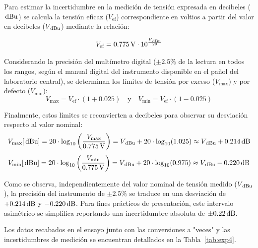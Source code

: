 Para estimar la incertidumbre en la medición de tensión expresada en decibeles
($\,\mathrm{dBu}$) se calcula la tensión eficaz ($V_{\text{ef}}$) correspondiente en
voltios a partir del valor en decibeles ($V_{\,\mathrm{dBu}}$) mediante la relación:

\begin{equation}
    V_{\text{ef}} = 0.775\,\mathrm{V} \cdot 10^{\frac{V_{\,\mathrm{dBu}}}{20}}
\end{equation}

Considerando la precisión del multímetro digital ($\pm 2.5\%$ de la lectura en
todos los rangos, según el manual digital del instrumento disponible en el pañol del laboratorio central), se determinan los límites de tensión por exceso ($V_{\text{max}}$) y por defecto ($V_{\text{min}}$):
\begin{equation}
    V_{\text{max}} = V_{\text{ef}} \cdot (1 + 0.025) \quad \text{y} \quad V_{\text{min}} = V_{\text{ef}} \cdot (1 - 0.025)
\end{equation}

Finalmente, estos límites se reconvierten a decibeles para observar su desviación respecto al valor nominal:
\begin{equation}
    V_{\text{max}} [\,\mathrm{dBu}] = 20 \cdot \log_{10} \left( \frac{V_{\text{max}}}{0.775\,\mathrm{V}} \right) = V_{\,\mathrm{dBu}} + 20 \cdot \log_{10}(1.025) \approx V_{\,\mathrm{dBu}} + 0.214\,\mathrm{dB}
\end{equation}
\begin{equation}
    V_{\text{min}} [\,\mathrm{dBu}] = 20 \cdot \log_{10} \left( \frac{V_{\text{min}}}{0.775\,\mathrm{V}} \right) = V_{\,\mathrm{dBu}} + 20 \cdot \log_{10}(0.975) \approx V_{\,\mathrm{dBu}} - 0.220\,\mathrm{dB}
\end{equation}

Como se observa, independientemente del valor nominal de tensión medido ($V_{\,\mathrm{dBu}}$), la precisión del instrumento de $\pm 2.5\%$ se traduce en una desviación de $+0.214\,\mathrm{dB}$ y $-0.220\,\mathrm{dB}$. Para fines prácticos de presentación, este intervalo asimétrico se simplifica reportando una incertidumbre absoluta de $\pm 0.22\,\mathrm{dB}$.

Los datos recabados en el ensayo junto con las conversiones a "veces" y las incertidumbres de medición se encuentran detallados en la Tabla~\ref{tab:exp4}.

